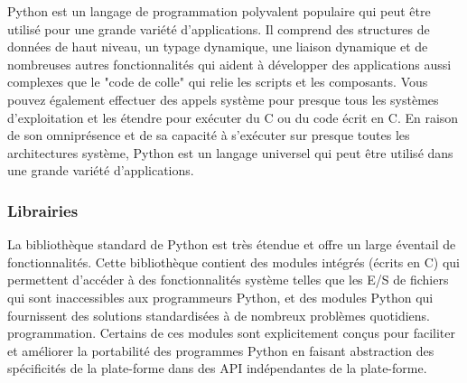     Python est un langage de programmation polyvalent populaire qui peut être utilisé pour une grande variété d'applications. Il comprend des structures de données de haut niveau, un typage dynamique, une liaison dynamique et de nombreuses autres fonctionnalités qui aident à développer des applications aussi  complexes que  le "code de colle" qui relie les scripts et les composants. Vous pouvez également  effectuer des appels système pour presque tous les systèmes d'exploitation et les étendre pour exécuter du C ou du code écrit en C. En raison de son omniprésence et de sa capacité à s'exécuter sur presque toutes les architectures système, Python est un langage universel qui peut être utilisé dans une grande variété d'applications.

    \subsubsection{Librairies}
    La bibliothèque standard de Python est très étendue et offre un large éventail de fonctionnalités. Cette bibliothèque contient des modules intégrés (écrits en C) qui permettent d'accéder à des fonctionnalités  système telles que les E/S de fichiers qui sont inaccessibles aux programmeurs Python, et des modules  Python qui fournissent des solutions standardisées à de nombreux problèmes quotidiens. programmation. Certains de ces modules sont explicitement conçus pour faciliter et améliorer la portabilité des programmes Python en faisant abstraction des spécificités de la plate-forme dans des API indépendantes de la plate-forme.
